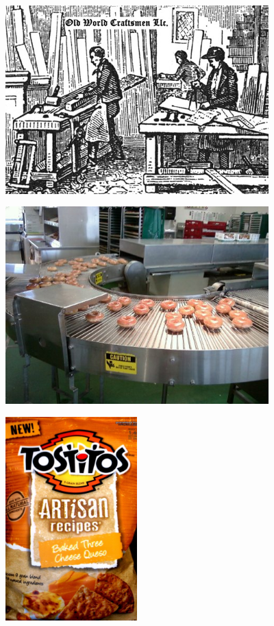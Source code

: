 \documentclass{beamer}
\begin{document}
\begin{frame}
\centering
\includegraphics[width=4in]{craftsmen.jpg}
\end{frame}

\begin{frame}
\centering
\includegraphics[width=4in]{donut.jpg}
\end{frame}

\begin{frame}
\centering
\includegraphics[width=2in]{tostitos.jpg}
\end{frame}
\end{document}
